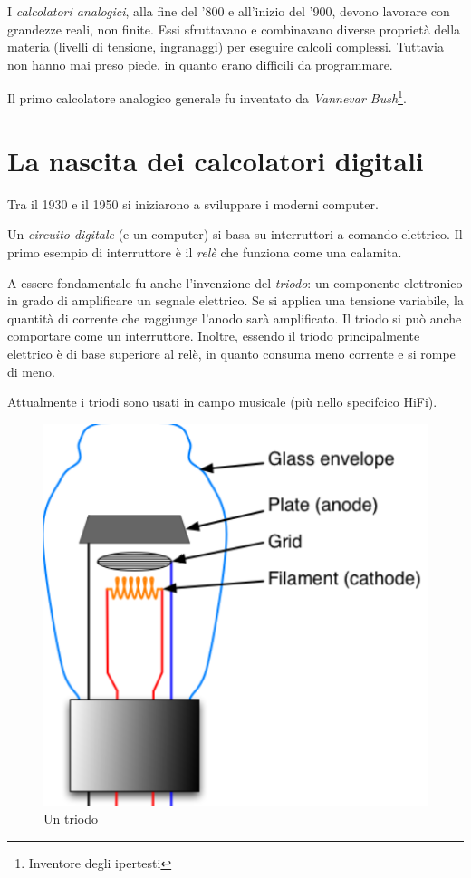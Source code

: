I \textit{calcolatori analogici}, alla fine del '800 e all'inizio del '900, devono lavorare con grandezze reali, non finite. Essi sfruttavano e combinavano diverse proprietà della materia (livelli di tensione, ingranaggi) per eseguire calcoli complessi. Tuttavia non hanno mai preso piede, in quanto erano difficili da programmare.

Il primo calcolatore analogico generale fu inventato da \textit{Vannevar Bush}\footnote{Inventore degli ipertesti}.

\section{La nascita dei calcolatori digitali}

Tra il 1930 e il 1950 si iniziarono a sviluppare i moderni computer. 

Un \textit{circuito digitale} (e un computer) si basa su interruttori a comando elettrico. Il primo esempio di interruttore è il \textit{relè} che funziona come una calamita.

A essere fondamentale fu anche l'invenzione del \textit{triodo}: un componente elettronico in grado di amplificare un segnale elettrico. Se si applica una tensione variabile, la quantità di corrente che raggiunge l'anodo sarà amplificato. Il triodo si può anche comportare come un interruttore. Inoltre, essendo il triodo principalmente elettrico è di base superiore al relè, in quanto consuma meno corrente e si rompe di meno.

Attualmente i triodi sono usati in campo musicale (più nello specifcico HiFi).

\begin{figure}
    \centering
    \includegraphics[scale = 0.5]{images/storia arch/Triodo.png}
    \caption{Un triodo}
    \label{fig:triodo}
\end{figure}

